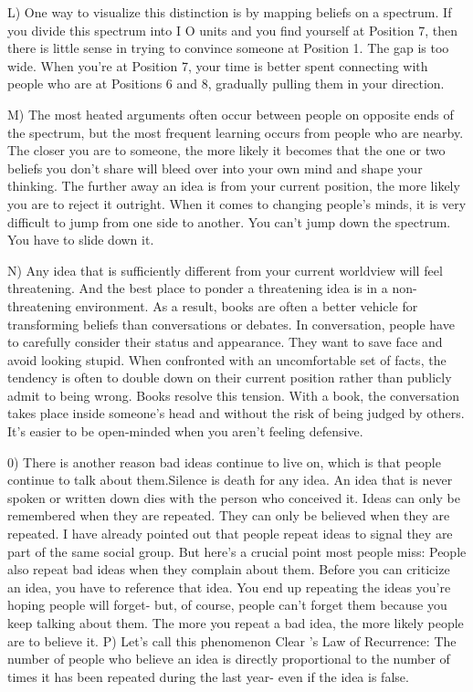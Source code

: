 \documentclass[UTF8,11pt]{ctexart}
\begin{document}
L) One way to visualize this distinction is by mapping beliefs on a spectrum. If you divide this spectrum into I O units and you find yourself at Position 7, then there is little sense in trying to convince someone at Position 1. The gap is too wide. When you're at Position 7, your time is better spent connecting with people who are at Positions 6 and 8, gradually pulling them in your direction.


M) The most heated arguments often occur between people on opposite ends of the spectrum, but the most frequent learning occurs from people who are nearby. The closer you are to someone, the more likely it becomes that the one or two beliefs you don't share will bleed over into your own mind and shape your thinking. The further away an idea is from your current position, the more likely you are to reject it outright. When it comes to changing people's minds, it is very difficult to jump from one side to another. You can't jump down the spectrum. You have to slide down it.


N) Any idea that is sufficiently different from your current worldview will feel threatening. And the best place to ponder a threatening idea is in a non-threatening environment. As a result, books are often a better vehicle for transforming beliefs than conversations or debates. In conversation, people have to carefully consider their status and appearance. They want to save face and avoid looking stupid. When confronted with an uncomfortable set of facts, the tendency is often to double down on their current position rather than publicly admit to being wrong. Books resolve this tension. With a book, the conversation takes place inside someone's head and without the risk of being judged by others. It's easier to be open-minded when you aren't feeling defensive.


0) There is another reason bad ideas continue to live on, which is that people continue to talk about them.Silence is death for any idea. An idea that is never spoken or written down dies with the person who conceived it. Ideas can only be remembered when they are repeated. They can only be believed when they are repeated. I have already pointed out that people repeat ideas to signal they are part of the same social group. But here's a crucial point most people miss: People also repeat bad ideas when they complain about them. Before you can criticize an idea, you have to reference that idea. You end up repeating the ideas you're hoping people will forget- but, of course, people can't forget them because you keep talking about them. The more you repeat a bad idea, the more likely people are to believe it. P) Let's call this phenomenon Clear 's Law of Recurrence: The number of people who believe an idea is directly proportional to the number of times it has been repeated during the last year- even if the idea is false.
\end{document}
